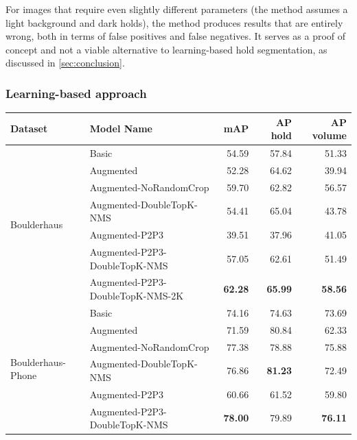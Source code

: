 \documentclass[final]{cvpr}
\begin{document}
For images that require even slightly different parameters (the method assumes a light background and dark holds), the method produces results that are entirely wrong, both in terms of false positives and false negatives.
It serves as a proof of concept and not a viable alternative to learning-based hold segmentation, as discussed in \autoref{sec:conclusion}.


\subsubsection{Learning-based approach} %


\begin{table}[t!]  %
    \centering
    \begin{tabular}{llrrr}
        \toprule
         Dataset & Model Name & mAP & \textbf{AP hold} & AP volume  \\\midrule
         \multirow{7}{*}{Boulderhaus} & Basic & 54.59 & 57.84 & 51.33 \\
                                     & Augmented & 52.28 & 64.62 & 39.94 \\
                                     & Augmented-NoRandomCrop & 59.70 & 62.82 & 56.57 \\
                                     & Augmented-DoubleTopK-NMS & 54.41 & 65.04 & 43.78 \\
                                     & Augmented-P2P3 & 39.51 & 37.96 & 41.05 \\
                                     & Augmented-P2P3-DoubleTopK-NMS & 57.05 & 62.61 & 51.49 \\
                                     & Augmented-P2P3-DoubleTopK-NMS-2K & \textbf{62.28} & \textbf{65.99} & \textbf{58.56} \\
        \hline
        \multirow{7}{*}{Boulderhaus-Phone} & Basic & 74.16 & 74.63 & 73.69 \\
                                        & Augmented & 71.59 & 80.84 & 62.33 \\
                                        & Augmented-NoRandomCrop & 77.38 & 78.88 & 75.88 \\
                                        & Augmented-DoubleTopK-NMS & 76.86 & \textbf{81.23} & 72.49 \\
                                        & Augmented-P2P3 & 60.66 & 61.52 & 59.80 \\
                                        & Augmented-P2P3-DoubleTopK-NMS & \textbf{78.00} & 79.89 & \textbf{76.11} \\

\end{tabular}
\end{table}
\end{document}
